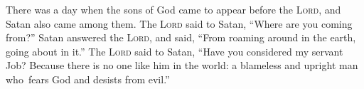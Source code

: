 
\begin{inparaenum}
    
     There was a day when the sons of God came to appear before the \textsc{Lord}, and Satan also came among them.%
     The \textsc{Lord} said to Satan, ``Where are you coming from?'' Satan answered the \textsc{Lord}, and said, ``From roaming around in the earth, going about in it.''%
     The \textsc{Lord} said to Satan, ``Have you considered my servant Job? Because there is no one like him in the world: a blameless and upright man who\understood\ fears God and desists from evil.''%
    
    
    \pvba{}%
    
    \pvba{}%
    
    {\noindent{} }%
    
    \pvbb{}{}%
    
    \pvba{}%
    
    \pvba{}%
    
    {\noindent{} }%
    
    \pvbb{}{}%
    
    
    \pvbb{}{}%
    
    \pvba{}%
    
    {\noindent{} }%
    
    \pveb{}{}%
    \pveb{}{}%
    
    {\noindent{} }%
\end{inparaenum}
